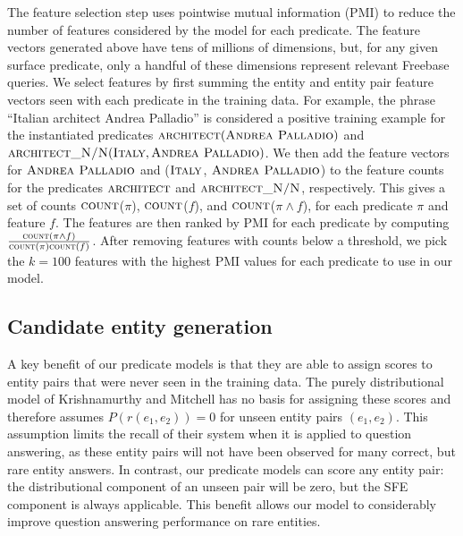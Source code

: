 \documentclass[11pt]{article}
\newcommand{\formalpredicate}[1]{\ensuremath{\textsc{#1}}}
\newcommand{\entity}[1]{\ensuremath{\textsc{#1}}}
\begin{document}
The feature selection step uses pointwise mutual information (PMI) to reduce
the number of features considered by the model for each predicate. The feature
vectors generated above have tens of millions of dimensions, but, for any given
surface predicate, only a handful of these dimensions represent relevant
Freebase queries. We select features by first summing the entity and entity
pair feature vectors seen with each predicate in the training data. For
example, the phrase ``Italian architect Andrea Palladio'' is considered a
positive training example for the instantiated predicates
$\formalpredicate{architect}(\entity{Andrea Palladio})$ and
$\formalpredicate{architect\_N/N}(\entity{Italy}, \entity{Andrea Palladio})$.
We then add the feature vectors for \entity{Andrea Palladio} and
(\entity{Italy}, \entity{Andrea Palladio}) to the feature counts for the
predicates \formalpredicate{architect} and \formalpredicate{architect\_N/N},
respectively. This gives a set of counts \formalpredicate{count}($\pi$),
\formalpredicate{count}($f$), and \formalpredicate{count}($\pi\land f$), for
each predicate $\pi$ and feature $f$.  The features are then ranked by PMI for
each predicate by computing $\frac{\formalpredicate{count}(\pi\land
f)}{\formalpredicate{count}(\pi)\formalpredicate{count}(f)}$.  After removing
features with counts below a threshold, we pick the $k=100$ features with the
highest PMI values for each predicate to use in our model.

\subsection{Candidate entity generation}
\label{sec:better-candidates}

A key benefit of our predicate models is that they are able to assign scores to
entity pairs that were never seen in the training data. The purely
distributional model of Krishnamurthy and Mitchell has no basis for assigning
these scores and therefore assumes $P(r(e_1,e_2)) = 0$ for unseen entity pairs
$(e_1,e_2)$. This assumption limits the recall of their system when it is
applied to question answering, as these entity pairs will not have been
observed for many correct, but rare entity answers. In contrast, our predicate
models can score any entity pair: the distributional component of an unseen
pair will be zero, but the SFE component is always applicable. This benefit
allows our model to considerably improve question answering performance on rare
entities.
\end{document}
